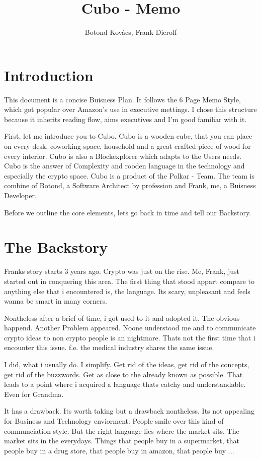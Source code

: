 \documentclass{report}
\title{Cubo - Memo}
\author{Botond Kovács, Frank Dierolf}
\begin{document}
\maketitle

\section{Introduction}

This document is a concise Buisness Plan.
It follows the 6 Page Memo Style, which got popular over Amazon's use in executive mettings.
I chose this structure because it inherits reading flow, aims executives and I'm good familiar with it.

First, let me introduce you to Cubo.
Cubo is a wooden cube, that you can place on every desk, coworking space, household and a great crafted piece of wood for every interior.
Cubo is also a Blockexplorer which adapts to the Users needs.
Cubo is the answer of Complexity and rooden language in the technology and especially the crypto space.
Cubo is a product of the Polkar - Team.
The team is combine of Botond, a Software Architect by profession and Frank, me, a Buisness Developer.

Before we outline the core elements, lets go back in time and tell our Backstory.

\section{The Backstory}
Franks story starts 3 years ago.
Crypto was just on the rise.
Me, Frank, just started out in conquering this area.
The first thing that stood appart compare to anything else that i encountered is, the language.
Its scary, unpleasant and feels wanna be smart in many corners.

Nontheless after a brief of time, i got used to it and adopted it.
The obvious happend. Another Problem appeared.
Noone understood me and to communicate crypto ideas to non crypto people is an nightmare.
Thats not the first time that i encounter this issue.
f.e. the medical industry shares the same issue.

I did, what i usually do. I simplify. Get rid of the ideas, get rid of the concepts, get rid of the buzzwords.
Get as close to the already known as possible. That leads to a point where i acquired a language thats catchy and understandable.
Even for Grandma.

It has a drawback. Its worth taking but a drawback nontheless.
Its not appealing for Business and Technology enviorment. People smile over this kind of communciation style.
But the right language lies where the market sits. The market sits in the everydays.
Things that people  buy in a supermarket, that people buy in a drug store, that people buy in amazon, that people buy ...
\end{document}
